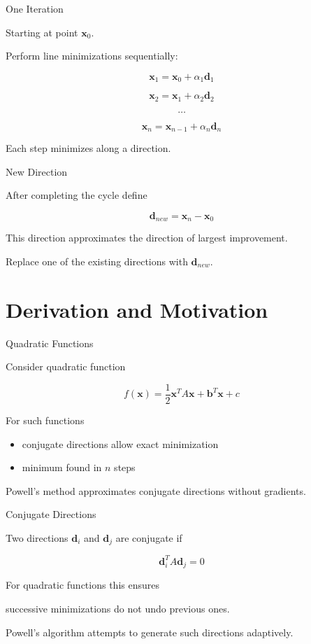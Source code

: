 \documentclass{beamer}
\begin{document}
\begin{frame}{One Iteration}

Starting at point $\mathbf{x}_0$.

Perform line minimizations sequentially:

\[
\mathbf{x}_1 = \mathbf{x}_0 + \alpha_1 \mathbf{d}_1
\]

\[
\mathbf{x}_2 = \mathbf{x}_1 + \alpha_2 \mathbf{d}_2
\]

\[
\dots
\]

\[
\mathbf{x}_n = \mathbf{x}_{n-1} + \alpha_n \mathbf{d}_n
\]

Each step minimizes along a direction.
\end{frame}

\begin{frame}{New Direction}

After completing the cycle define

\[
\mathbf{d}_{new} =
\mathbf{x}_n - \mathbf{x}_0
\]

This direction approximates the direction of largest improvement.

Replace one of the existing directions with $\mathbf{d}_{new}$.
\end{frame}

\section{Derivation and Motivation}

\begin{frame}{Quadratic Functions}

Consider quadratic function

\[
f(\mathbf{x}) =
\frac12 \mathbf{x}^T A \mathbf{x}
+ \mathbf{b}^T \mathbf{x} + c
\]

For such functions

\begin{itemize}
\item conjugate directions allow exact minimization
\item minimum found in $n$ steps
\end{itemize}

Powell's method approximates conjugate directions without gradients.
\end{frame}

\begin{frame}{Conjugate Directions}

Two directions $\mathbf{d}_i$ and $\mathbf{d}_j$ are conjugate if

\[
\mathbf{d}_i^T A \mathbf{d}_j = 0
\]

For quadratic functions this ensures

successive minimizations do not undo previous ones.

Powell's algorithm attempts to generate such directions adaptively.
\end{frame}
\end{document}

